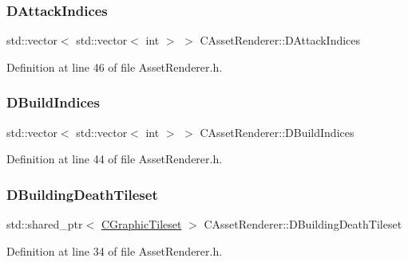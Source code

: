 \subsubsection{\texorpdfstring{D\+Attack\+Indices}{DAttackIndices}}
{\footnotesize\ttfamily std\+::vector$<$ std\+::vector$<$ int $>$ $>$ C\+Asset\+Renderer\+::\+D\+Attack\+Indices\hspace{0.3cm}{\ttfamily [protected]}}



Definition at line 46 of file Asset\+Renderer.\+h.

\hypertarget{classCAssetRenderer_aa892b01d11bef2aca7491461eb97dffb}{}\label{classCAssetRenderer_aa892b01d11bef2aca7491461eb97dffb} 
\subsubsection{\texorpdfstring{D\+Build\+Indices}{DBuildIndices}}
{\footnotesize\ttfamily std\+::vector$<$ std\+::vector$<$ int $>$ $>$ C\+Asset\+Renderer\+::\+D\+Build\+Indices\hspace{0.3cm}{\ttfamily [protected]}}



Definition at line 44 of file Asset\+Renderer.\+h.

\hypertarget{classCAssetRenderer_a9eb73be9e270946c01ba769112e92d1d}{}\label{classCAssetRenderer_a9eb73be9e270946c01ba769112e92d1d} 
\subsubsection{\texorpdfstring{D\+Building\+Death\+Tileset}{DBuildingDeathTileset}}
{\footnotesize\ttfamily std\+::shared\+\_\+ptr$<$ \hyperlink{classCGraphicTileset}{C\+Graphic\+Tileset} $>$ C\+Asset\+Renderer\+::\+D\+Building\+Death\+Tileset\hspace{0.3cm}{\ttfamily [protected]}}



Definition at line 34 of file Asset\+Renderer.\+h.

\hypertarget{classCAssetRenderer_aaf8c772b7d3fbe8c145282e5106749d6}{}\label{classCAssetRenderer_aaf8c772b7d3fbe8c145282e5106749d6} 
